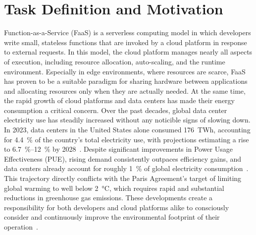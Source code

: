 \clearpage
\section{Task Definition and Motivation}


Function-as-a-Service (FaaS) is a serverless computing model in which developers write small, stateless functions that are invoked by a cloud platform in response to external requests.
In this model, the cloud platform manages nearly all aspects of execution, including resource allocation, auto-scaling, and the runtime environment.
Especially in edge environments, where resources are scarce, FaaS has proven to be a suitable paradigm for sharing hardware between applications and allocating resources only when they are actually needed.
At the same time, the rapid growth of cloud platforms and data centers has made their energy consumption a critical concern.
Over the past decades, global data center electricity use has steadily increased without any noticible signs of slowing down.
In 2023, data centers in the United States alone consumed \SI{176}{TWh}, accounting for \SI{4.4}{\percent} of the country's total electricity use, with projections estimating a rise to \SIrange{6.7}{12}{\percent} by 2028~\cite{shehabi_united_2024}.
Despite significant improvements in Power Usage Effectiveness (PUE), rising demand consistently outpaces efficiency gains, and data centers already account for roughly \SI{1}{\percent} of global electricity consumption~\cite{masanet_recalibrating_2020,sharma_jevons_2017,gandhi_metrics_2023}.
This trajectory directly conflicts with the Paris Agreement's target of limiting global warming to well below \SI{2}{\celsius}, which requires rapid and substantial reductions in greenhouse gas emissions.
These developments create a responsibility for both developers and cloud platforms alike to consciously consider and continuously improve the environmental footprint of their operation~\cite{chien_driving_2021}.

